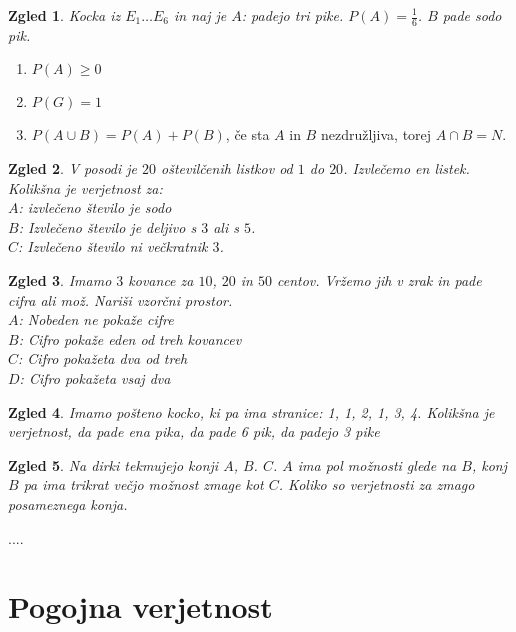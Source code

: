 \documentclass{article}
\newtheorem*{zgled}{Zgled}
\begin{document}
\begin{zgled}
    Kocka iz $E_1 \ldots E_6$ in naj je $A$: padejo tri pike. $P(A)=\frac{1}{6}$. $B$ pade sodo pik.
\end{zgled}

\begin{enumerate}[i]
    \item $P(A)\geq 0$
    \item $P(G)=1$
    \item $P(A\cup B)=P(A)+P(B)$, če sta $A$ in $B$ nezdružljiva, torej $A\cap B=N$.
\end{enumerate}

\begin{zgled}
    V posodi je $20$ oštevilčenih listkov od $1$ do $20$. Izvlečemo en listek. Kolikšna je verjetnost za:\\
    $A$: izvlečeno število je sodo\\
    $B$: Izvlečeno število je deljivo s $3$ ali s $5$.\\
    $C$: Izvlečeno število ni večkratnik $3$.
\end{zgled}

\begin{zgled}
    Imamo $3$ kovance za $10$, $20$ in $50$ centov. Vržemo jih v zrak in pade cifra ali mož. Nariši vzorčni prostor.\\
    $A$: Nobeden ne pokaže cifre\\
    $B$: Cifro pokaže eden od treh kovancev\\
    $C$: Cifro pokažeta dva od treh\\
    $D$: Cifro pokažeta vsaj dva\\
\end{zgled}

\begin{zgled}
    Imamo pošteno kocko, ki pa ima stranice: 1, 1, 2, 1, 3, 4. Kolikšna je verjetnost, da pade ena pika, da pade 6 pik, da padejo 3 pike
\end{zgled}

\begin{zgled}
    Na dirki tekmujejo konji $A$, $B$. $C$. $A$ ima pol možnosti glede na $B$, konj $B$ pa ima trikrat večjo možnost zmage kot $C$. Koliko so verjetnosti za zmago posameznega konja.
\end{zgled}

....



\section*{Pogojna verjetnost}
\end{document}
